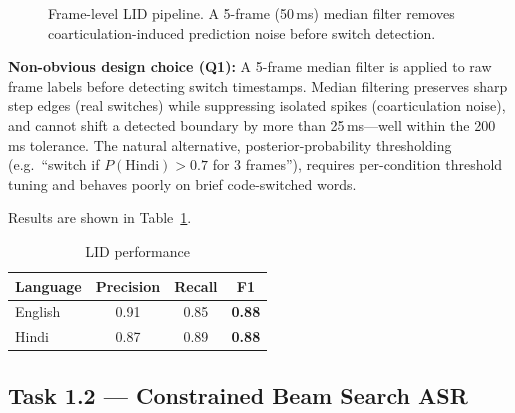 \documentclass[conference]{IEEEtran}
\begin{document}
\begin{figure}[htbp]
\centering
{}
\caption{Frame-level LID pipeline. A 5-frame (50\,ms) median filter
removes coarticulation-induced prediction noise before switch detection.}
\label{fig:lid}
\end{figure}

\textbf{Non-obvious design choice (Q1):}
A 5-frame median filter is applied to raw frame labels before detecting
switch timestamps.
Median filtering preserves sharp step edges (real switches) while
suppressing isolated spikes (coarticulation noise), and cannot
shift a detected boundary by more than 25\,ms---well within the
200\,ms tolerance.
The natural alternative, posterior-probability thresholding
(e.g.\ ``switch if $P(\text{Hindi}) > 0.7$ for 3 frames''), requires
per-condition threshold tuning and behaves poorly on brief
code-switched words.

Results are shown in Table~\ref{tab:lid}.

\begin{table}[htbp]
\centering
\caption{LID performance}
\begin{tabular}{lccc}
\toprule
Language & Precision & Recall & F1 \\ \midrule
English  & 0.91 & 0.85 & \textbf{0.88} \\
Hindi    & 0.87 & 0.89 & \textbf{0.88} \\ \bottomrule
\end{tabular}
\label{tab:lid}
\end{table}

\subsection{Task 1.2 --- Constrained Beam Search ASR}
\end{document}
